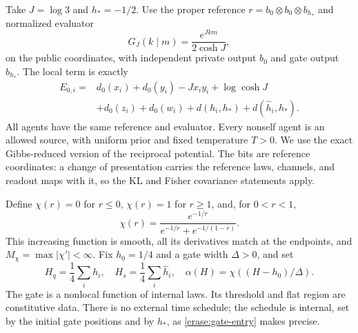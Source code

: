 Take $J=\log3$ and $h_*=-1/2$. Use the proper reference $r=b_0\otimes b_0\otimes b_{h_*}$ and normalized evaluator
\begin{equation}
 G_J(k\mid m)=\frac{e^{Jkm}}{2\cosh J},
 \label{erase:evaluator}
\end{equation}
on the public coordinates, with independent private output $b_0$ and gate output $b_{h_*}$. The local term is exactly
\begin{equation}
 \begin{split}
 E_{0,i}={}&d_0(x_i)+d_0(y_i)-Jx_iy_i+\log\cosh J\\
 &+d_0(z_i)+d_0(w_i)+d(h_i,h_*)+d(\widehat h_i,h_*).
 \end{split}
 \label{erase:local}
\end{equation}
All agents have the same reference and evaluator. Every nonself agent is an allowed source, with uniform prior and fixed temperature $T>0$. We use the exact Gibbs-reduced version of the reciprocal potential. The bits are reference coordinates: a change of presentation carries the reference laws, channels, and readout maps with it, so the KL and Fisher covariance statements apply.

Define $\chi(r)=0$ for $r\leq0$, $\chi(r)=1$ for $r\geq1$, and, for $0<r<1$,
\begin{equation}
 \chi(r)=\frac{e^{-1/r}}{e^{-1/r}+e^{-1/(1-r)}}.
 \label{erase:flat-step}
\end{equation}
This increasing function is smooth, all its derivatives match at the endpoints, and $M_\chi=\max|\chi'|<\infty$. Fix $h_0=1/4$ and a gate width $\Delta>0$, and set
\begin{equation}
 H_q=\frac14\sum_i h_i,\quad
 H_s=\frac14\sum_i\widehat h_i,\quad
 \alpha(H)=\chi((H-h_0)/\Delta).
 \label{erase:gate}
\end{equation}
The gate is a nonlocal function of internal laws. Its threshold and flat region are constitutive data. There is no external time schedule; the schedule is internal, set by the initial gate positions and by $h_*$, as \cref{erase:gate-entry} makes precise.

